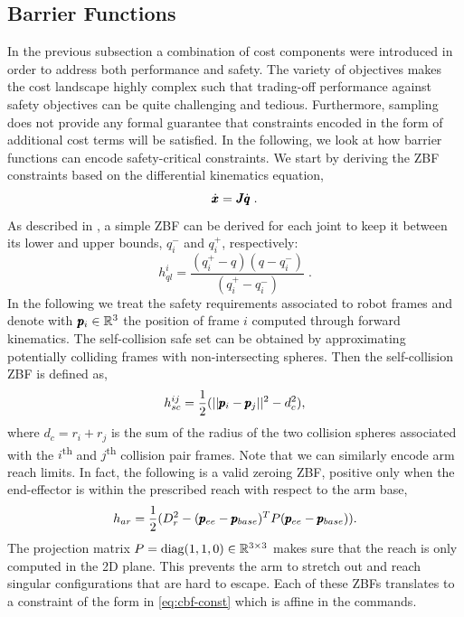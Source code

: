 
\subsection{Barrier Functions}
In the previous subsection a combination of cost components were introduced in order to address both performance and safety. The variety of objectives makes the cost landscape highly complex such that trading-off performance against safety objectives can be quite challenging and tedious. Furthermore, sampling does not provide any formal guarantee that constraints encoded in the form of additional cost terms will be satisfied. In the following, we look at how barrier functions can encode safety-critical constraints. We start by deriving the ZBF constraints based on the differential kinematics equation,
\begin{equation}
    \dot{\pmb{x}} = \pmb{J} \dot{\pmb{q}}\;.
\end{equation}
As described in \cite{benzi2021optimization}, a simple ZBF can be derived for each joint to keep it between its lower and upper bounds, $q_i^-$ and $q_i^+$, respectively:
\begin{equation}
h_{ql}^i = \frac{(q_i^+ - q)(q - q_i^-)}{(q_i^+ - q_i^-)}\;.
\end{equation}
In the following we treat the safety requirements associated to robot frames and denote with $\pmb{p}_{i} \in \mathbb{R}^{3}$ the position of frame $i$ computed through forward kinematics.  
The self-collision safe set can be obtained by approximating potentially colliding frames with non-intersecting spheres. Then the self-collision ZBF is defined as,
\begin{equation}
    h_{sc}^{ij} = \frac{1}{2}(||\pmb{p}_i - \pmb{p}_j||^2 - d_c^2),
\end{equation}
where $d_c = r_i + r_j$ is the sum of the radius of the two collision spheres associated with the $i$\textsuperscript{th}  and $j$\textsuperscript{th} collision pair frames. Note that we can similarly encode arm reach limits. In fact, the following is a valid zeroing ZBF, positive only when the end-effector is within the prescribed reach with respect to the arm base,
\begin{equation}
    h_{ar} = \frac{1}{2}(D_r^2 - (\pmb{p}_{ee} - \pmb{p}_{base})^T P (\pmb{p}_{ee} - \pmb{p}_{base}) ).
\end{equation}
The projection matrix $P = \text{diag}(1, 1, 0) \in \mathbb{R}^{3 \times 3}$ makes sure that the reach is only computed in the 2D plane. This prevents the arm to stretch out and reach singular configurations that are hard to escape. Each of these ZBFs translates to a constraint of the form in \eqref{eq:cbf-const} which is affine in the commands. 

